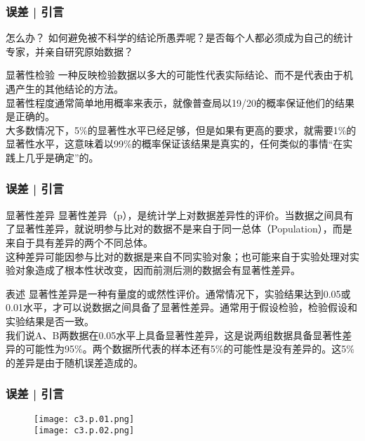 \begin{frame}
  \frametitle{误差 | 引言}
  \begin{block}{怎么办？}
    如何避免被不科学的结论所愚弄呢？是否每个人都必须成为自己的统计专家，并亲自研究原始数据？
  \end{block}
  \pause
  \begin{block}{显著性检验}
    一种反映检验数据以多大的可能性代表实际结论、而不是代表由于机遇产生的其他结论的方法。\\
    \vspace{0.3em}
    显著性程度通常简单地用概率来表示，就像普查局以19/20的概率保证他们的结果是正确的。\\
    \vspace{0.3em}
大多数情况下，5\%的显著性水平已经足够，但是如果有更高的要求，就需要1\%的显著性水平，这意味着以99\%的概率保证该结果是真实的，任何类似的事情“在实践上几乎是确定”的。
  \end{block}
\end{frame}

\begin{frame}
  \frametitle{误差 | 引言}
  \begin{block}{显著性差异}
显著性差异（p），是统计学上对数据差异性的评价。当数据之间具有了显著性差异，就说明参与比对的数据不是来自于同一总体（Population），而是来自于具有差异的两个不同总体。\\
\vspace{0.3em}
  这种差异可能因参与比对的数据是来自不同实验对象；也可能来自于实验处理对实验对象造成了根本性状改变，因而前测后测的数据会有显著性差异。
  \end{block}
  \pause
  \begin{block}{表述}
    显著性差异是一种有量度的或然性评价。通常情况下，实验结果达到0.05或0.01水平，才可以说数据之间具备了显著性差异。通常用于假设检验，检验假设和实验结果是否一致。\\
    \vspace{0.3em}
我们说A、B两数据在0.05水平上具备显著性差异，这是说两组数据具备显著性差异的可能性为95\%。两个数据所代表的样本还有5\%的可能性是没有差异的。这5\%的差异是由于随机误差造成的。\\
  \end{block}
\end{frame}

\begin{frame}
  \frametitle{误差 | 引言}
  \begin{figure}
    \centering
    \texttt{[image: c3.p.01.png]}\\
    \texttt{[image: c3.p.02.png]}
  \end{figure}
\end{frame}


